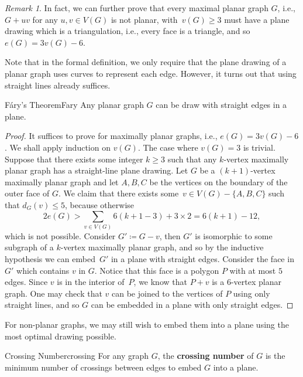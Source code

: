 \documentclass[math]{amznotes}
\theoremstyle{remark}
\newtheorem*{remark}{Remark}
\begin{document}
\begin{notebox}
    \begin{remark}
        In fact, we can further prove that every maximal planar graph $G$, i.e., $G + uv$ for any $u, v \in V(G)$ is not planar,  with~$v(G) \geq 3$ must have a plane drawing which is a triangulation, i.e., every face is a triangle, and so~$e(G) = 3v(G) - 6$.
    \end{remark}
\end{notebox}
Note that in the formal definition, we only require that the plane drawing of a planar graph uses curves to represent each edge. However, it turns out that using straight lines already suffices.
\begin{thmbox}{F\'{a}ry's Theorem}{Fary}
    Any planar graph $G$ can be draw with straight edges in a plane.
    \tcblower
    \begin{proof}
        It suffices to prove for maximally planar graphs, i.e., $e(G) = 3v(G) - 6$. We shall apply induction on $v(G)$. The case where $v(G) = 3$ is trivial. Suppose that there exists some integer $k \geq 3$ such that any $k$-vertex maximally planar graph has a straight-line plane drawing. Let $G$ be a $(k + 1)$-vertex maximally planar graph and let $A, B, C$ be the vertices on the boundary of the outer face of $G$. We claim that there exists some~$v \in V(G) - \{A, B, C\}$ such that $d_G(v) \leq 5$, because otherwise 
        \begin{equation*}
            2e(G) > \sum_{v \in V(G)}6(k + 1 - 3) + 3 \times 2 = 6(k + 1) - 12,
        \end{equation*}
        which is not possible. Consider $G' \coloneqq G - v$, then $G'$ is isomorphic to some subgraph of a $k$-vertex maximally planar graph, and so by the inductive hypothesis we can embed~$G'$ in a plane with straight edges. Consider the face in $G'$ which contains $v$ in $G$. Notice that this face is a polygon $P$ with at most $5$ edges. Since $v$ is in the interior of~$P$, we know that $P + v$ is a $6$-vertex planar graph. One may check that $v$ can be joined to the vertices of $P$ using only straight lines, and so $G$ can be embedded in a plane with only straight edges.
    \end{proof}
\end{thmbox}
For non-planar graphs, we may still wish to embed them into a plane using the most optimal drawing possible.
\begin{dfnbox}{Crossing Number}{crossing}
    For any graph $G$, the {\color{red} \textbf{crossing number}} of $G$ is the minimum number of crossings between edges to embed $G$ into a plane.
\end{dfnbox}
\end{document}
